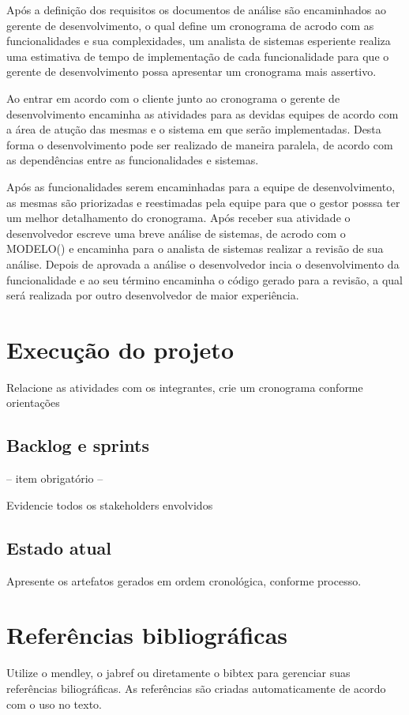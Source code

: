 \documentclass[	DIV=calc,%
							paper=a4,%
							fontsize=12pt,%
							onecolumn]{scrartcl}	 					%
\begin{document}
Após a definição dos requisitos os documentos de análise são encaminhados ao gerente de desenvolvimento, o qual define um cronograma de acrodo com as funcionalidades e
sua complexidades, um analista de sistemas esperiente realiza uma estimativa de tempo de implementação de cada funcionalidade para que o gerente de desenvolvimento possa
apresentar um cronograma mais assertivo.

Ao entrar em acordo com o cliente junto ao cronograma o gerente de desenvolvimento encaminha as atividades para as devidas equipes de acordo com a área de atução das mesmas
e o sistema em que serão implementadas. Desta forma o desenvolvimento pode ser realizado de maneira paralela, de acordo com as dependências entre as funcionalidades e sistemas.

Após as funcionalidades serem encaminhadas para a equipe de desenvolvimento, as mesmas são priorizadas e reestimadas pela equipe para que o gestor posssa ter um melhor
detalhamento do cronograma. Após receber sua atividade o desenvolvedor escreve uma breve análise de sistemas, de acrodo com o MODELO() e encaminha para o analista de sistemas
realizar a revisão de sua análise. Depois de aprovada a análise o desenvolvedor incia o desenvolvimento da funcionalidade e ao seu término encaminha o código gerado para
a revisão, a qual será realizada por outro desenvolvedor de maior experiência.


\section{Execução do projeto}

Relacione as atividades com os integrantes, crie um cronograma conforme orientações
\subsection{Backlog e sprints}
-- item obrigatório --

Evidencie todos os stakeholders envolvidos


\subsection{Estado atual}
Apresente os artefatos gerados em ordem cronológica, conforme processo.


\section{Referências bibliográficas}
Utilize o mendley, o jabref ou diretamente o bibtex para gerenciar suas referências biliográficas. As referências são criadas automaticamente de acordo com o uso no texto.
\end{document}

